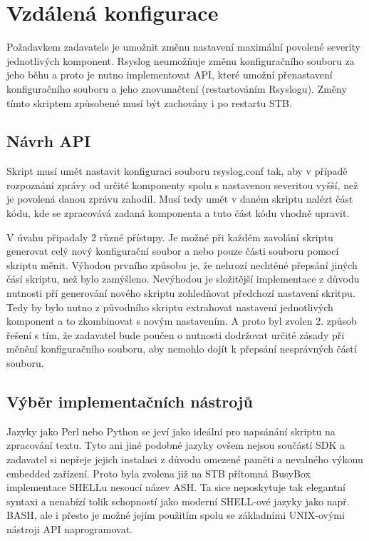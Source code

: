 \documentclass[thesis=B,czech]{FITthesis}[2012/06/26]
\begin{document}
\section{Vzdálená konfigurace}
Požadavkem zadavatele je umožnit změnu nastavení maximální povolené severity jednotlivých komponent. Rsyslog neumožňuje změnu konfiguračního souboru za jeho běhu a proto je nutno implementovat API, které umožní přenastavení konfiguračního souboru a jeho znovunačtení (restartováním Rsyslogu).
Změny tímto skriptem způsobené musí být zachovány i po restartu STB.

\subsection{Návrh API}
Skript musí umět nastavit konfiguraci souboru rsyslog.conf tak, aby v případě rozpoznání zprávy od určité komponenty spolu s nastavenou severitou vyšší, než je povolená danou zprávu zahodil. 
Musí tedy umět v daném skriptu nalézt část kódu, kde se zpracovává zadaná komponenta a tuto část kódu vhodně upravit.

V úvahu připadaly 2 různé přístupy. Je možné při každém zavolání skriptu generovat celý nový konfigurační soubor a nebo pouze části souboru pomocí skriptu měnit.
Výhodou prvního způsobu je, že nehrozí nechtěné přepsání jiných čásí skriptu, než bylo zamýšleno. Nevýhodou je složitější implementace z důvodu nutnosti pří generování nového skriptu zohledňovat předchozí nastavení skritpu. Tedy by bylo nutno z původního skriptu extrahovat nastavení jednotlivých komponent a to zkombinovat s novým nastavením.
A proto byl zvolen 2. způsob řešení s tím, že zadavatel bude poučen o nutnosti dodržovat určité zásady při měnění konfiguračního souboru, aby nemohlo dojít k přepsání nesprávných částí souboru.

\subsection{Výběr implementačních nástrojů}
Jazyky jako Perl nebo Python se jeví jako ideální pro napsánání skriptu na zpracování textu. Tyto ani jiné podobné jazyky ovšem nejsou součástí SDK a zadavatel si nepřeje jejich instalaci z důvodu omezené paměti a nevalného výkonu embedded zařízení. Proto byla zvolena již na STB přítomná BusyBox implementace SHELLu nesoucí název ASH. Ta sice neposkytuje tak elegantní syntaxi a nenabízí tolik schopností jako moderní SHELL-ové jazyky jako např. BASH, ale i přesto je možné jejím použitím spolu se základními UNIX-ovými nástroji API naprogramovat.
\end{document}
